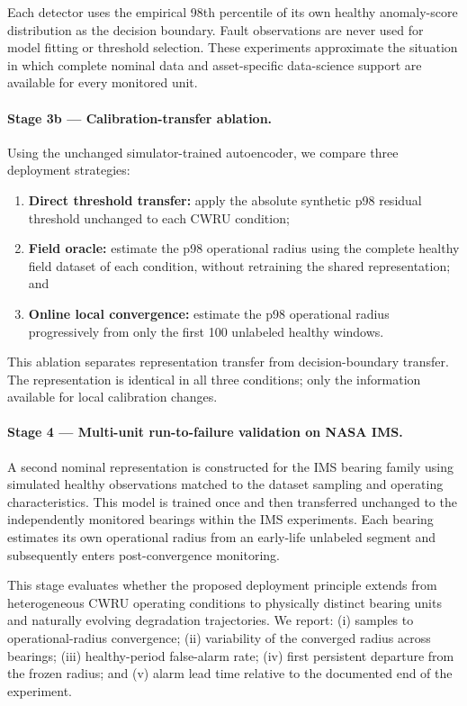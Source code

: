 \documentclass[11pt,a4paper]{article}
\begin{document}
Each detector uses the empirical 98th percentile of its own healthy anomaly-score distribution
as the decision boundary. Fault observations are never used for model fitting or threshold
selection. These experiments approximate the situation in which complete nominal data and
asset-specific data-science support are available for every monitored unit.

\paragraph{Stage 3b --- Calibration-transfer ablation.}
Using the unchanged simulator-trained autoencoder, we compare three deployment strategies:

\begin{enumerate}[leftmargin=1.5em]
    \item \textbf{Direct threshold transfer:} apply the absolute synthetic p98 residual
    threshold unchanged to each CWRU condition;

    \item \textbf{Field oracle:} estimate the p98 operational radius using the complete healthy
    field dataset of each condition, without retraining the shared representation; and

    \item \textbf{Online local convergence:} estimate the p98 operational radius progressively
    from only the first 100 unlabeled healthy windows.
\end{enumerate}

This ablation separates representation transfer from decision-boundary transfer. The
representation is identical in all three conditions; only the information available for local
calibration changes.

\paragraph{Stage 4 --- Multi-unit run-to-failure validation on NASA IMS.}
A second nominal representation is constructed for the IMS bearing family using simulated
healthy observations matched to the dataset sampling and operating characteristics. This model
is trained once and then transferred unchanged to the independently monitored bearings within
the IMS experiments. Each bearing estimates its own operational radius from an early-life
unlabeled segment and subsequently enters post-convergence monitoring.

This stage evaluates whether the proposed deployment principle extends from heterogeneous CWRU
operating conditions to physically distinct bearing units and naturally evolving degradation
trajectories. We report:
(i) samples to operational-radius convergence;
(ii) variability of the converged radius across bearings;
(iii) healthy-period false-alarm rate;
(iv) first persistent departure from the frozen radius; and
(v) alarm lead time relative to the documented end of the experiment.
\end{document}
